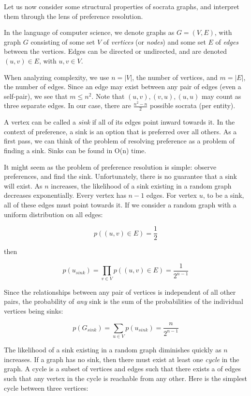 \documentclass[12pt]{book}
\begin{document}
Let us now consider some structural properties of socrata graphs, and interpret them through the lens of preference resolution.

In the language of computer science, we denote graphs as $G = (V, E)$, with graph $G$ consisting of some set $V$ of \textit{vertices} (or \textit{nodes}) and some set $E$ of \textit{edges} between the vertices.
Edges can be directed or undirected, and are denoted $(u,v) \in E$, with $u, v \in V$.

When analyzing complexity, we use $n = |V|$, the number of vertices, and $m = |E|$, the number of edges.
Since an edge may exist between any pair of edges (even a self-pair), we see that $m \leq n^2$.
Note that $(u,v), (v,u), (u,u)$ may count as three separate edges.
In our case, there are $\frac{n^2-n}{2}$ possible socrata (per entity).

A vertex can be called a \textit{sink} if all of its edges point inward towards it.
In the context of preference, a sink is an option that is preferred over all others.
As a first pass, we can think of the problem of resolving preference as a problem of finding a sink.
Sinks can be found in O(n) time.

It might seem as the problem of preference resolution is simple: observe preferences, and find the sink.
Unfortunately, there is no guarantee that a sink will exist.
As $n$ increases, the likelihood of a sink existing in a random graph decreases exponentially.
Every vertex has $n-1$ edges.
For vertex $u$, to be a sink, all of these edges must point towards it.
If we consider a random graph with a uniform distribution on all edges:

\[
p((u,v) \in E)= \frac{1}{2}
\]

then

\[
p(u_{sink}) = \prod_{v \in V}p((u,v) \in E) = \frac{1}{2^{n-1}}
\]

Since the relationships between any pair of vertices is independent of all other pairs, the probability of \textit{any} sink is the sum of the probabilities of the individual vertices being sinks:

\[
p(G_{sink}) = \sum_{u \in V}p(u_{sink}) = \frac{n}{2^{n-1}}
\]

The likelihood of a sink existing in a random graph diminishes quickly as $n$ increases.
If a graph has no sink, then there must exist at least one \textit{cycle} in the graph.
A cycle is a subset of vertices and edges such that there exists a  of edges such that any vertex in the cycle is reachable from any other.
Here is the simplest cycle between three vertices:
\end{document}
